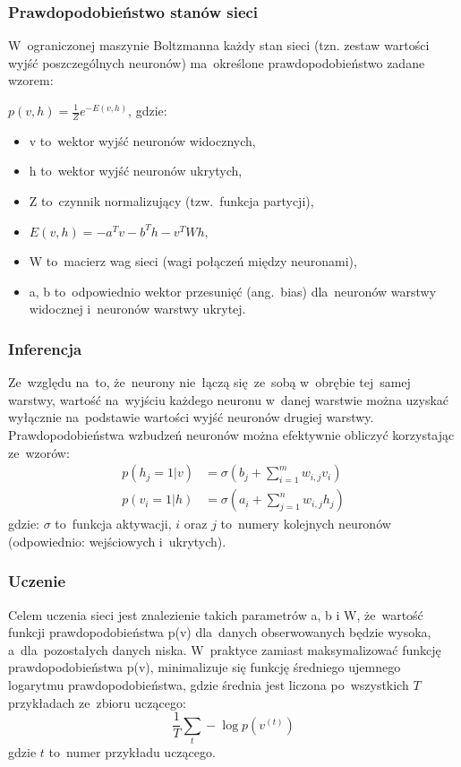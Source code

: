 \subsubsection{Prawdopodobieństwo stanów sieci}
W~ograniczonej maszynie Boltzmanna każdy stan sieci (tzn. zestaw wartości wyjść poszczególnych neuronów)
ma~określone prawdopodobieństwo zadane wzorem:

$p(v,h)=\frac{1}{Z}e^{-E(v,h)}$, gdzie:
\begin{itemize}
  \item v to~wektor wyjść neuronów widocznych,
  \item h to~wektor wyjść neuronów ukrytych,
  \item Z to~czynnik normalizujący (tzw.~funkcja partycji),
  \item $E(v,h)=-a^{T}v-b^{T}h-v^{T}Wh$,
  \item W to~macierz wag sieci (wagi połączeń między neuronami),
  \item a, b to~odpowiednio wektor przesunięć (ang.~bias) dla~neuronów warstwy widocznej i~neuronów warstwy ukrytej.
\end{itemize}

\subsubsection{Inferencja}
Ze~względu na~to, że~neurony nie~łączą się~ze~sobą w~obrębie tej~samej warstwy, wartość na~wyjściu każdego
neuronu w~danej warstwie można uzyskać wyłącznie na~podstawie wartości wyjść neuronów drugiej warstwy.
Prawdopodobieństwa wzbudzeń neuronów można efektywnie obliczyć korzystając ze~wzorów:
\begin{equation}
    \begin{split}
        p(h_{j}=1|v)&=\sigma(b_{j}+\sum\limits_{i=1}^{m}w_{i,j}v_{i}) \\
        p(v_{i}=1|h)&=\sigma(a_{i}+\sum\limits_{j=1}^{n}w_{i,j}h_{j})
    \end{split}
	\label{eqn:rbm_inference}
\end{equation}
gdzie: $\sigma$ to~funkcja aktywacji, $i$ oraz $j$ to~numery kolejnych neuronów (odpowiednio: wejściowych i~ukrytych).


\subsubsection{Uczenie}
Celem uczenia sieci jest znalezienie takich parametrów a, b i W, że~wartość funkcji prawdopodobieństwa p(v)
dla~danych obserwowanych będzie wysoka, a~dla~pozostałych danych niska. W~praktyce zamiast maksymalizować
funkcję prawdopodobieństwa p(v), minimalizuje się funkcję średniego ujemnego logarytmu prawdopodobieństwa,
gdzie średnia jest liczona po~wszystkich $T$ przykładach ze~zbioru uczącego:
\begin{equation*}
\frac{1}{T}\sum\limits_{t}-\log{p(v^{(t)})}
\end{equation*}
gdzie $t$ to~numer przykładu uczącego.

